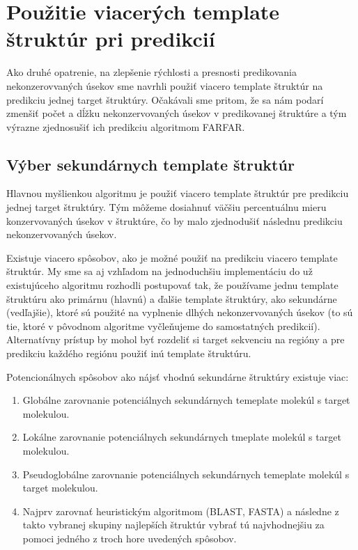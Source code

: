 \chapter{Použitie viacerých template štruktúr pri predikcií}

Ako druhé opatrenie, na zlepšenie rýchlosti a presnosti predikovania nekonzerovvaných úsekov sme navrhli  použiť viacero template štruktúr na predikciu jednej target štruktúry. Očakávali sme pritom, že sa nám podarí zmenšiť počet a dĺžku nekonzervovaných úsekov v predikovanej štruktúre a tým výrazne zjednosušiť ich predikciu algoritmom FARFAR.

\section{Výber sekundárnych template štruktúr}
Hlavnou myšlienkou algoritmu je použiť viacero template štruktúr pre predikciu jednej target štruktúry. Tým môžeme dosiahnuť väčšiu percentuálnu mieru konzervovaných úsekov v štruktúre, čo by malo zjednodušiť následnu predikciu nekonzervovaných úsekov.


\indent  Existuje viacero spôsobov, ako je možné použiť na predikciu viacero template štruktúr. My sme sa aj vzhľadom na jednoduchšiu implementáciu do už existujúceho algoritmu rozhodli postupovať tak, že používame jednu template štruktúru ako primárnu (hlavnú) a ďalšie template štruktúry, ako sekundárne (vedľajšie), ktoré sú použité na vyplnenie dlhých nekonzervovaných úsekov (to sú tie, ktoré v pôvodnom algoritme vyčleňujeme do samostatných predikcií). Alternatívny prístup by mohol byť rozdeliť si target sekvenciu na regióny a pre predikciu každého regiónu použiť inú template štruktúru.   


\indent Potencionálnych spôsobov ako nájsť vhodnú sekundárne štruktúry existuje viac: 
\begin{enumerate}
\item Globálne zarovnanie potenciálnych sekundárnych temeplate molekúl s target molekulou. 
\item Lokálne zarovnanie potenciálnych sekundárnych tmeplate molekúl s target molekulou. 
\item Pseudoglobálne zarovnanie potenciálnych sekundárnych temeplate molekúl s target molekulou. 
\item Najprv zarovnať heuristickým algoritmom (BLAST, FASTA) a následne z takto vybranej skupiny najlepších štruktúr vybrať tú najvhodnejšiu za pomoci jedného z troch hore uvedených spôsobov.
\end{enumerate}


